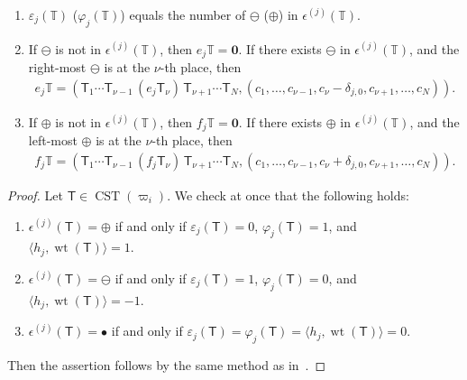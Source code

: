 \documentclass[ALCO,ThmDefs,Unicode,epreuves]{cedram}
\newcommand\bm[1]{\boldsymbol{#1}}
\DeclareMathOperator{\wt}{wt}
\DeclareMathOperator{\CST}{CST}
\begin{document}
\begin{prop}
\begin{enumerate}[label=(\roman*)]
be the resulting tuple such that no 
$\bm{\oplus}$ 
placed to the left of 
$\bm{\ominus}$.
\item
$\varepsilon_j(\mathbb{T})$ 
(\resp $\varphi_j(\mathbb{T})$) 
equals the number of 
$\bm{\ominus}$ (\resp $\bm{\oplus}$) 
in 
$\epsilon^{(j)}(\mathbb{T})$. 
\item
If 
$\bm{\ominus}$ 
is not in 
$\epsilon^{(j)}(\mathbb{T})$, 
then 
$e_j \mathbb{T} = \bm{0}$. 
If there exists 
$\bm{\ominus}$ 
in 
$\epsilon^{(j)}(\mathbb{T})$, 
and the right-most 
$\bm{\ominus}$ 
is at the $\nu$-th place, then
\begin{align}
e_j \mathbb{T} = \left( \mathsf{T}_1 \cdots \mathsf{T}_{\nu -1} \, (e_j \mathsf{T}_{\nu}) \, \mathsf{T}_{\nu +1} \cdots \mathsf{T}_N , 
(c_1 , \ldots , c_{\nu -1} , c_{\nu} - \delta_{j,0} , c_{\nu +1} , \ldots , c_N) \right).
\end{align}
\item
If 
$\bm{\oplus}$ 
is not in 
$\epsilon^{(j)}(\mathbb{T})$, 
then 
$f_j \mathbb{T} = \bm{0}$.
If there exists 
$\bm{\oplus}$ 
in 
$\epsilon^{(j)}(\mathbb{T})$, 
and the left-most 
$\bm{\oplus}$ 
is at the $\nu$-th place, then
\begin{align}
f_j \mathbb{T} = \left( \mathsf{T}_1 \cdots \mathsf{T}_{\nu -1} \, (f_j \mathsf{T}_{\nu}) \, \mathsf{T}_{\nu +1} \cdots \mathsf{T}_N , 
(c_1 , \ldots , c_{\nu -1} , c_{\nu} + \delta_{j,0} , c_{\nu +1} , \ldots , c_N) \right).
\end{align}
\end{enumerate}
\end{prop}

\begin{proof}
Let $\mathsf{T} \in \CST (\varpi_i)$. 
We check at once that the following holds:
\begin{enumerate}[label=(\arabic*)]
\item
$\epsilon^{(j)}(\mathsf{T}) = \bm{\oplus}$ 
if and only if 
$\varepsilon_j(\mathsf{T}) = 0$, 
$\varphi_j(\mathsf{T}) = 1$, and 
$\langle h_j , \wt (\mathsf{T}) \rangle = 1$.
\item
$\epsilon^{(j)}(\mathsf{T}) = \bm{\ominus}$ 
if and only if 
$\varepsilon_j(\mathsf{T}) = 1$, 
$\varphi_j(\mathsf{T}) = 0$, and 
$\langle h_j , \wt (\mathsf{T}) \rangle = -1$.
\item
$\epsilon^{(j)}(\mathsf{T}) = \bullet$ 
if and only if 
$\varepsilon_j(\mathsf{T}) = \varphi_j(\mathsf{T}) = \langle h_j , \wt (\mathsf{T}) \rangle = 0$. 
\end{enumerate}
Then the assertion follows by the same method as in~\cite[\S~2.1]{KN}.
\end{proof}




\end{document}
